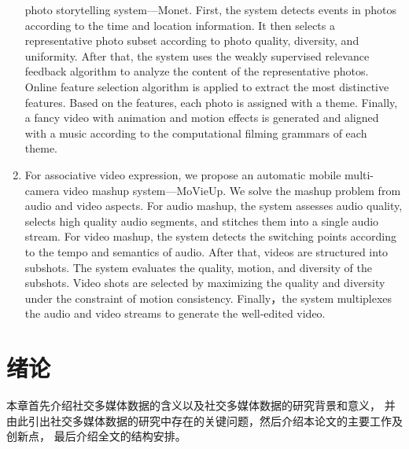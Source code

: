 \documentclass[doctor]{ustcthesis}
\begin{document}
\begin{enabstract}
\begin{enumerate}
            photo storytelling system---Monet. First, the system detects events in
            photos according to the time and location information. It then selects
            a representative photo subset according to photo quality, diversity, and
            uniformity. After that, the system uses the weakly supervised relevance feedback
            algorithm to analyze the content of the representative photos.
            Online feature selection algorithm is applied to extract the most distinctive
            features. Based on the features, each photo is assigned with a theme.
            Finally, a fancy video with animation and motion effects is generated and aligned with a music
            according to the computational filming grammars of each theme.
        \item For associative video expression, we propose an automatic mobile
            multi-camera video mashup system---MoVieUp. We solve the mashup problem from audio and video aspects.
            For audio mashup, the system assesses audio quality,
            selects high quality audio segments, and stitches them into a single audio stream. For video
            mashup, the system detects the switching points according to the tempo
            and semantics of audio.  After that, videos are structured into
            subshots. The system evaluates the quality, motion, and diversity
            of the subshots.
            Video shots are selected by maximizing the quality and diversity
            under the constraint of motion consistency.
            Finally，the system multiplexes the audio and video streams to
            generate the well-edited video.
    \end{enumerate}

\end{enabstract}


\tableofcontents
\listoffigures
\listoftables
\listofalgorithms  %
% 

\mainmatter
\chapter{绪论}
本章首先介绍社交多媒体数据的含义以及社交多媒体数据的研究背景和意义，
并由此引出社交多媒体数据的研究中存在的关键问题，然后介绍本论文的主要工作及创新点，
最后介绍全文的结构安排。
\end{document}
